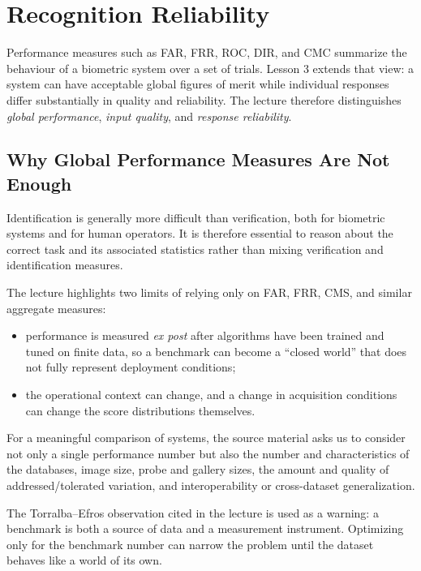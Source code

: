 \documentclass[11pt,a4paper,oneside]{report}
\begin{document}
\chapter{Recognition Reliability}
\label{chap:recognition-reliability}

Performance measures such as FAR, FRR, ROC, DIR, and CMC summarize the
behaviour of a biometric system over a set of trials.  Lesson 3 extends that
view: a system can have acceptable global figures of merit while individual
responses differ substantially in quality and reliability.  The lecture
therefore distinguishes \emph{global performance}, \emph{input quality}, and
\emph{response reliability}.

\section{Why Global Performance Measures Are Not Enough}
\label{sec:global-measures-not-enough}

Identification is generally more difficult than verification, both for
biometric systems and for human operators.  It is therefore essential to reason
about the correct task and its associated statistics rather than mixing
verification and identification measures.

The lecture highlights two limits of relying only on FAR, FRR, CMS, and similar
aggregate measures:
\begin{itemize}
    \item performance is measured \emph{ex post} after algorithms have been
          trained and tuned on finite data, so a benchmark can become a
          ``closed world'' that does not fully represent deployment conditions;
    \item the operational context can change, and a change in acquisition
          conditions can change the score distributions themselves.
\end{itemize}

For a meaningful comparison of systems, the source material asks us to consider
not only a single performance number but also the number and characteristics of
the databases, image size, probe and gallery sizes, the amount and quality of
addressed/tolerated variation, and interoperability or cross-dataset
generalization.

\begin{remarkbox}
The Torralba--Efros observation cited in the lecture is used as a warning: a
benchmark is both a source of data and a measurement instrument.  Optimizing
only for the benchmark number can narrow the problem until the dataset behaves
like a world of its own.
\end{remarkbox}
\end{document}
